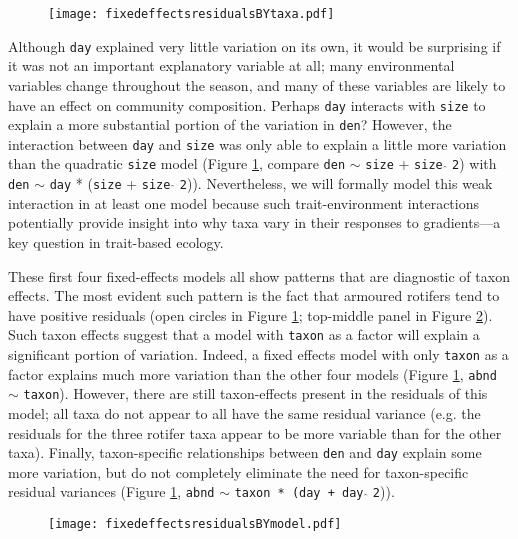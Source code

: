 \documentclass[12pt]{ecologyFORAPPENDIX}
\newcommand{\processfloatnow}{
	\begingroup
	\let\cleardoublepage\relax
	\let\clearpage\relax
	\processdelayedfloats
	\endgroup
}
\begin{document}
\begin{figure}
\texttt{[image: fixedeffectsresidualsBYtaxa.pdf]}
\caption{}
\label{fig:fixedeffectsresidualsBYtaxa}
\end{figure}
\processfloatnow


Although \texttt{day} explained very little variation on its own, it would be surprising if it was not an important explanatory variable at all; many environmental variables change throughout the season, and many of these variables are likely to have an effect on community composition.   
Perhaps \texttt{day} interacts with \texttt{size} to explain a more substantial portion of the variation in \texttt{den}?  However, the interaction between \texttt{day} and \texttt{size} was only able to explain a little more variation than the quadratic \texttt{size} model (Figure \ref{fig:fixedeffectsresidualsBYtaxa}, compare \texttt{den} $\sim$ \texttt{size} + \texttt{size} $\hat{}$ \texttt{2}) with \texttt{den} $\sim$ \texttt{day} * (\texttt{size} + \texttt{size} $\hat{}$ \texttt{2})).  Nevertheless, we will formally model this weak interaction in at least one model because such trait-environment interactions potentially provide insight into why taxa vary in their responses to gradients---a key question in trait-based ecology.

These first four fixed-effects models all show patterns that are diagnostic of taxon effects.  The most evident such pattern is the fact that armoured rotifers tend to have positive residuals (open circles in Figure \ref{fig:fixedeffectsresidualsBYtaxa}; top-middle panel in Figure \ref{fig:fixedeffectsresidualsBYmodel}).  Such taxon effects suggest that a model with \texttt{taxon} as a factor will explain a significant portion of variation.  Indeed, a fixed effects model with only \texttt{taxon} as a factor explains much more variation than the other four models (Figure \ref{fig:fixedeffectsresidualsBYtaxa}, \texttt{abnd} $\sim$ \texttt{taxon}).  However, there are still taxon-effects present in the residuals of this model; all taxa do not appear to all have the same residual variance (e.g. the residuals for the three rotifer taxa appear to be more variable than for the other taxa).  Finally, taxon-specific relationships between \texttt{den} and \texttt{day} explain some more variation, but do not completely eliminate the need for taxon-specific residual variances (Figure \ref{fig:fixedeffectsresidualsBYtaxa}, \texttt{abnd} $\sim$ \texttt{taxon * (day + day} $\hat{}$ \texttt{2})).

\begin{figure}
\texttt{[image: fixedeffectsresidualsBYmodel.pdf]}
\caption{}
\label{fig:fixedeffectsresidualsBYmodel}
\end{figure}
\processfloatnow
\end{document}
